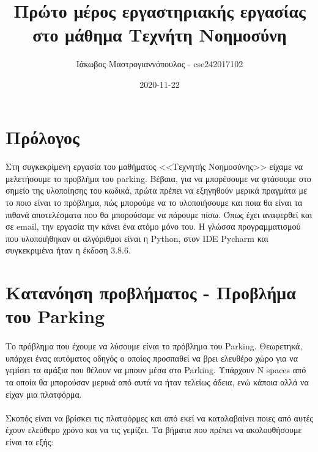 \documentclass{article}
\title{Πρώτο μέρος εργαστηριακής εργασίας στο μάθημα Τεχνήτη Νοημοσύνη}
\date{2020-11-22}
\author{Ιάκωβος Μαστρογιαννόπουλος - cse242017102}
\begin{document}
    \maketitle
    
    \newpage
    \tableofcontents
    \newpage
    \lstlistoflistings

    \newpage
    \section{Πρόλογος}

    \paragraph{}
    Στη συγκεκρίμενη εργασία του μαθήματος <<Τεχνητής Νοημοσύνης>> είχαμε να μελετήσουμε το προβλήμα του parking. Βέβαια,
    για να μπορέσουμε να φτάσουμε στο σημείο της υλοποίησης του κωδικά, πρώτα πρέπει να εξηγηθούν μερικά πραγμάτα με το ποιο είναι
    το πρόβλημα, πώς μπορούμε να το υλοποιήσουμε και ποια θα είναι τα πιθανά αποτελέσματα που θα μπορούσαμε να πάρουμε πίσω.  
    Όπως έχει αναφερθεί και σε email, την εργασία την κάνει ένα ατόμο μόνο του. Η γλώσσα προγραμματισμού που υλοποιήθηκαν οι αλγόριθμοι
    είναι η Python, στον IDE Pycharm και συγκεκριμένα ήταν η έκδοση 3.8.6.

    \newpage
    \section{Κατανόηση προβλήματος - Προβλήμα του Parking}
    \paragraph{}
    Το πρόβλημα που έχουμε να λύσουμε είναι το πρόβλημα του Parking. Θεωρετηκά, υπάρχει ένας αυτόματος οδηγός ο οποίος προσπαθεί να βρει
    ελευθέρο χώρο για να γεμίσει τα αμάξια που θέλουν να μπουν μέσα στο Parking. Υπάρχουν Ν spaces από τα οποία θα μπορούσαν μερικά από αυτά
    να ήταν τελείως άδεια, ενώ κάποια αλλά να είχαν μια πλατφόρμα.

    \paragraph{}
    Σκοπός είναι να βρίσκει τις πλατφόρμες και από εκεί να καταλαβαίνει ποιες από αυτές έχουν ελεύθερο χρόνο και να τις γεμίζει. Τα βήματα που
    πρέπει να ακολουθήσουμε είναι τα εξής:
\end{document}
